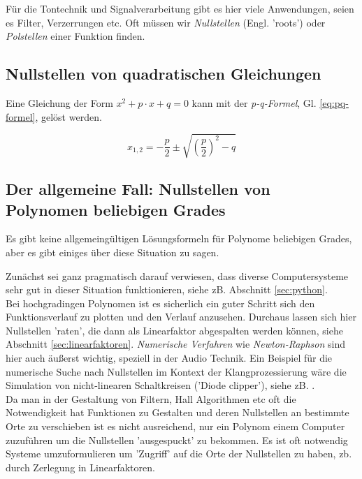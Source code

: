 Für die Tontechnik und Signalverarbeitung gibt es hier viele Anwendungen, seien es Filter, Verzerrungen etc. Oft müssen wir \emph{Nullstellen} (Engl. 'roots') oder \emph{Polstellen} einer Funktion finden. 

\subsection{Nullstellen von quadratischen Gleichungen}

Eine Gleichung der Form $x^2 + p \cdot x + q = 0$ kann mit der \emph{p-q-Formel}, Gl. \ref{eq:pq-formel}, gelöst werden.


\begin{equation}
x_{1,2} = -\frac{p}{2} \pm \sqrt{\left( \frac{p}{2} \right)^2 - q } \label{eq:pq-formel}
\end{equation}

\subsection{Der allgemeine Fall: Nullstellen von Polynomen beliebigen Grades}
Es gibt keine allgemeingültigen Lösungsformeln für Polynome beliebigen Grades, aber es gibt einiges über diese Situation zu sagen.



Zunächst sei ganz pragmatisch darauf verwiesen, dass diverse Computersysteme sehr gut in dieser Situation funktionieren, siehe zB. Abschnitt \ref{sec:python}. \\
Bei hochgradingen Polynomen ist es sicherlich ein guter Schritt sich den Funktionsverlauf zu plotten und den Verlauf anzusehen. Durchaus lassen sich hier Nullstellen 'raten', die dann als Linearfaktor abgespalten werden können, siehe Abschnitt \ref{sec:linearfaktoren}. \emph{Numerische Verfahren} wie \emph{Newton-Raphson} sind hier auch äußerst wichtig, speziell in der Audio Technik. Ein Beispiel für die numerische Suche nach Nullstellen im Kontext der Klangprozessierung wäre die Simulation von nicht-linearen Schaltkreisen ('Diode clipper'), siehe zB. \cite{holmes2015improving}. \\

Da man in der Gestaltung von Filtern, Hall Algorithmen etc oft die Notwendigkeit hat Funktionen zu Gestalten und deren Nullstellen an bestimmte Orte zu verschieben ist es nicht ausreichend, nur ein Polynom einem Computer zuzuführen um die Nullstellen 'ausgespuckt' zu bekommen. Es ist oft notwendig Systeme umzuformulieren um 'Zugriff' auf die Orte der Nullstellen zu haben, zb. durch Zerlegung in Linearfaktoren. 


